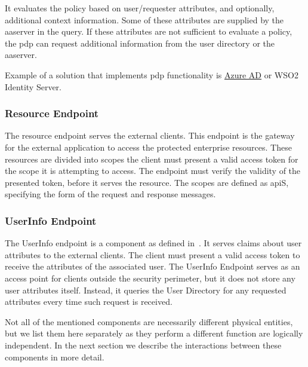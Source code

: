 It evaluates the policy based on user/requester attributes, and optionally, additional context information. Some of these attributes are supplied by the \acrshort{aaserver} in the query. If these attributes are not sufficient to evaluate a policy, the \acrshort{pdp} can request additional information from the user directory or the \acrshort{aaserver}.

Example of a solution that implements \acrshort{pdp} functionality is \href{sec:online-access-control}{Azure AD} or WSO2 Identity Server\footnotemark.
% 
    
\subsubsection{Resource Endpoint}
The resource endpoint serves the external clients. This endpoint is the gateway for the external application to access the protected enterprise resources. These resources are divided into scopes the client must present a valid access token for the scope it is attempting to access. The endpoint must verify the validity of the presented token, before it serves the resource. The scopes are defined as \acrshort{api}S, specifying the form of the request and response messages.
    
\subsubsection{UserInfo Endpoint}
The UserInfo endpoint is a component as defined in~\cite{Sakimura2014Final:1}. It serves claims about user attributes to the external clients. The client must present a valid access token to receive the attributes of the associated user. The UserInfo Endpoint serves as an access point for clients outside the security perimeter, but it does not store any user attributes itself. Instead, it queries the User Directory for any requested attributes every time such request is received.

\bigskip\noindent
Not all of the mentioned components are necessarily different physical entities, but we list them here separately as they perform a different function are logically independent. In the next section we describe the interactions between these components in more detail.